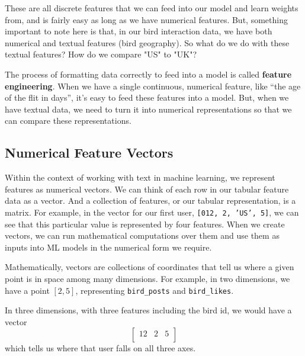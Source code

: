 \documentclass[11pt, table]{diazessay} %
\begin{document}
\begin{sloppypar}
These are all discrete features that we can feed into our model and learn weights from, and is fairly easy as long as we have numerical features.  But, something important to note here is that, in our bird interaction data, we have both numerical and textual features (bird geography). So what do we do with these textual features? How do we compare "US" to "UK"?

The process of formatting data correctly to feed into a model is called \textbf{feature engineering}. When we have a single continuous, numerical feature, like “the age of the flit in days”, it’s easy to feed these features into a model. But, when we have textual data, we need to turn it into numerical representations so that we can compare these representations.  

\subsection{Numerical Feature Vectors}
Within the context of working with text in machine learning, we represent features as numerical vectors. We can think of each row in our tabular feature data as a vector. And a collection of features, or our tabular representation, is a matrix. For example, in the vector for our first user, \texttt{[012, 2, 'US', 5]}, we can see that this particular value is represented by four features. When we create vectors, we can run mathematical computations over them and use them as inputs into ML models in the numerical form we require.

Mathematically, vectors are collections of coordinates that tell us where a given point is in space among many dimensions. For example, in two dimensions, we have a point $[2,5]$, representing \texttt{bird_posts} and \texttt{bird_likes}.


In three dimensions, with three features including the bird id, we would have a vector
\begin{equation}
\begin{bmatrix}
12 & 2 & 5\\
\end{bmatrix}
\end{equation}
which tells us where that user falls on all three axes.

\begin{figure}[htbp]
\begin{adjustbox}{center}
\begin{tikzpicture}
[scale=3, tdplot_main_coords, axis/.style={->,blue,thick},
vector/.style={-stealth,azure,very thick},
vector guide/.style={dashed,azure,thick}]


\end{tikzpicture}
\end{adjustbox}
\end{figure}
\end{sloppypar}
\end{document}
